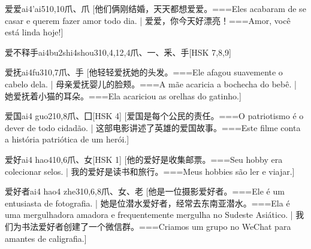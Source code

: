 \begin{EntryWithPhonetic}{爱爱}{ai4'ai5}{10,10}{⽖、⽖}
  [他们俩刚结婚，天天都想爱爱。===Eles acabaram de se casar e querem fazer amor todo dia. | 爱爱，你今天好漂亮！===Amor, você está linda hoje!]
\end{EntryWithPhonetic}

\begin{EntryWithPhonetic}{爱不释手}{ai4bu2shi4shou3}{10,4,12,4}{⽖、⼀、⾤、⼿}[HSK 7,8,9]
\end{EntryWithPhonetic}

\begin{EntryWithPhonetic}{爱抚}{ai4fu3}{10,7}{⽖、⼿}
  [他轻轻爱抚她的头发。===Ele afagou suavemente o cabelo dela. | 母亲爱抚婴儿的脸颊。===A mãe acaricia a bochecha do bebê. | 她爱抚着小猫的耳朵。===Ela acariciou as orelhas do gatinho.]
\end{EntryWithPhonetic}

\begin{EntryWithPhonetic}{爱国}{ai4 guo2}{10,8}{⽖、⼞}[HSK 4]
  [爱国是每个公民的责任。===O patriotismo é o dever de todo cidadão. | 这部电影讲述了英雄的爱国故事。===Este filme conta a história patriótica de um herói.]
\end{EntryWithPhonetic}

\begin{EntryWithPhonetic}{爱好}{ai4 hao4}{10,6}{⽖、⼥}[HSK 1]
  [他的爱好是收集邮票。===Seu hobby era colecionar selos.  | 我的爱好是读书和旅行。===Meus hobbies são ler e viajar.]
\end{EntryWithPhonetic}

\begin{EntryWithPhonetic}{爱好者}{ai4 hao4 zhe3}{10,6,8}{⽖、⼥、⽼}
  [他是一位摄影爱好者。===Ele é um entusiasta de fotografia. | 她是位潜水爱好者，经常去东南亚潜水。===Ela é uma mergulhadora amadora e frequentemente mergulha no Sudeste Asiático.  | 我们为书法爱好者创建了一个微信群。===Criamos um grupo no WeChat para amantes de caligrafia.]
\end{EntryWithPhonetic}

